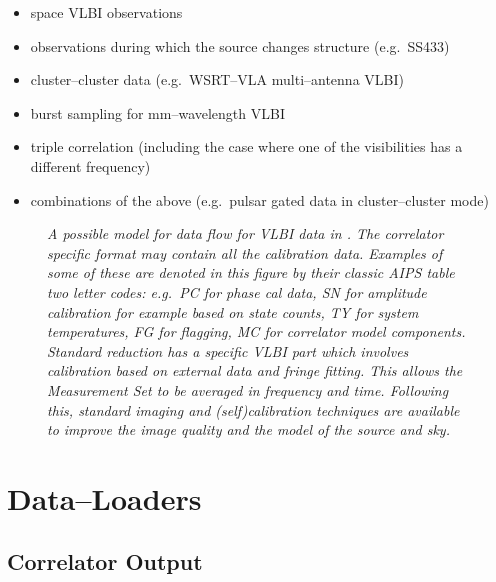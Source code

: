 \begin{itemize}

\item space VLBI observations

\item observations during which the source changes structure (e.g.\ SS433)

\item cluster--cluster data (e.g.\  WSRT--VLA multi--antenna VLBI)

\item burst sampling for mm--wavelength VLBI

\item triple correlation (including the case where one of the visibilities
has a different frequency)

\item combinations of the above (e.g.\ pulsar gated data in
  cluster--cluster mode)

\end{itemize}

\begin{figure}
     \begin{center}
     \end{center}
     \caption[aipsflow]{\label{flow}\sl A possible model for data
       flow for VLBI data in \aipspp.  The correlator specific format
       may contain all the calibration data.  Examples of some of
       these are denoted in this figure by their classic AIPS table
       two letter codes: e.g.\ PC for phase cal data, SN for amplitude
       calibration for example based on state counts, TY for system
       temperatures, FG for flagging, MC for correlator model
       components. Standard reduction has a specific VLBI part which
       involves calibration based on external data and fringe fitting.
       This allows the Measurement Set to be averaged in frequency and
       time. Following this, standard imaging and (self)calibration
       techniques are available to improve the image quality and the
       model of the source and sky.}

\end{figure}

\section{Data--Loaders}

\subsection{Correlator Output}

